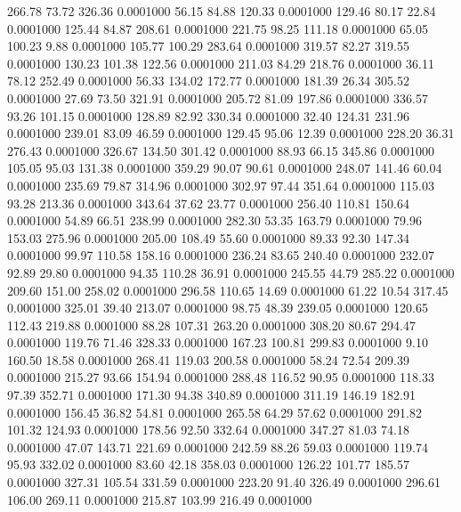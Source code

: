  266.78   73.72  326.36   0.0001000
  56.15   84.88  120.33   0.0001000
 129.46   80.17   22.84   0.0001000
 125.44   84.87  208.61   0.0001000
 221.75   98.25  111.18   0.0001000
  65.05  100.23    9.88   0.0001000
 105.77  100.29  283.64   0.0001000
 319.57   82.27  319.55   0.0001000
 130.23  101.38  122.56   0.0001000
 211.03   84.29  218.76   0.0001000
  36.11   78.12  252.49   0.0001000
  56.33  134.02  172.77   0.0001000
 181.39   26.34  305.52   0.0001000
  27.69   73.50  321.91   0.0001000
 205.72   81.09  197.86   0.0001000
 336.57   93.26  101.15   0.0001000
 128.89   82.92  330.34   0.0001000
  32.40  124.31  231.96   0.0001000
 239.01   83.09   46.59   0.0001000
 129.45   95.06   12.39   0.0001000
 228.20   36.31  276.43   0.0001000
 326.67  134.50  301.42   0.0001000
  88.93   66.15  345.86   0.0001000
 105.05   95.03  131.38   0.0001000
 359.29   90.07   90.61   0.0001000
 248.07  141.46   60.04   0.0001000
 235.69   79.87  314.96   0.0001000
 302.97   97.44  351.64   0.0001000
 115.03   93.28  213.36   0.0001000
 343.64   37.62   23.77   0.0001000
 256.40  110.81  150.64   0.0001000
  54.89   66.51  238.99   0.0001000
 282.30   53.35  163.79   0.0001000
  79.96  153.03  275.96   0.0001000
 205.00  108.49   55.60   0.0001000
  89.33   92.30  147.34   0.0001000
  99.97  110.58  158.16   0.0001000
 236.24   83.65  240.40   0.0001000
 232.07   92.89   29.80   0.0001000
  94.35  110.28   36.91   0.0001000
 245.55   44.79  285.22   0.0001000
 209.60  151.00  258.02   0.0001000
 296.58  110.65   14.69   0.0001000
  61.22   10.54  317.45   0.0001000
 325.01   39.40  213.07   0.0001000
  98.75   48.39  239.05   0.0001000
 120.65  112.43  219.88   0.0001000
  88.28  107.31  263.20   0.0001000
 308.20   80.67  294.47   0.0001000
 119.76   71.46  328.33   0.0001000
 167.23  100.81  299.83   0.0001000
   9.10  160.50   18.58   0.0001000
 268.41  119.03  200.58   0.0001000
  58.24   72.54  209.39   0.0001000
 215.27   93.66  154.94   0.0001000
 288.48  116.52   90.95   0.0001000
 118.33   97.39  352.71   0.0001000
 171.30   94.38  340.89   0.0001000
 311.19  146.19  182.91   0.0001000
 156.45   36.82   54.81   0.0001000
 265.58   64.29   57.62   0.0001000
 291.82  101.32  124.93   0.0001000
 178.56   92.50  332.64   0.0001000
 347.27   81.03   74.18   0.0001000
  47.07  143.71  221.69   0.0001000
 242.59   88.26   59.03   0.0001000
 119.74   95.93  332.02   0.0001000
  83.60   42.18  358.03   0.0001000
 126.22  101.77  185.57   0.0001000
 327.31  105.54  331.59   0.0001000
 223.20   91.40  326.49   0.0001000
 296.61  106.00  269.11   0.0001000
 215.87  103.99  216.49   0.0001000
